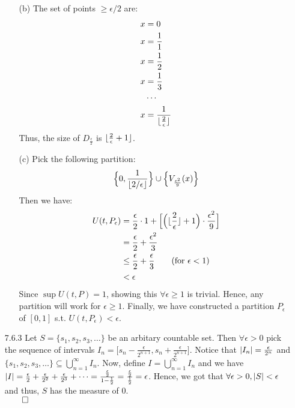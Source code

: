 \documentclass[11pt]{article}
\DeclarePairedDelimiter\abs{\lvert}{\rvert}%
\DeclarePairedDelimiter\floor{\lfloor}{\rfloor}
\begin{document}
\begin{itemize}
\begin{itemize}
            \item[(b)]
                The set of points $\geq \epsilon/2$ are:
                \begin{align*}
                    x &= 0\\
                    x &= \frac{1}{1}\\
                    x &= \frac{1}{2}\\
                    x &= \frac{1}{3}\\
                    &\cdots\\
                    x &= \frac{1}{\floor{\frac{2}{\epsilon}}}
                \end{align*}
                Thus, the size of $D_{\frac{\epsilon}{2}}$ is
                $\floor{\frac{2}{\epsilon} + 1}$.

            \item[(c)]
                Pick the following partition:
                \begin{equation*}
                    \Big\{0, \frac{1}{\floor{2/\epsilon}}\Big\} \cup
                        \Big\{V_{\frac{\epsilon^2}{9}}(x)\Big\}
                \end{equation*}
                Then we have:
                \begin{align*}
                  U(t, P_\epsilon) &= \frac{\epsilon}{2} \cdot 1 +
                        \Big[{\Big({\floor{\frac{2}{\epsilon}} + 1}\Big)
                        \cdot \frac{\epsilon^2}{9}}\Big]\\
                    &= \frac{\epsilon}{2} + \frac{\epsilon^2}{3}\\
                    &\leq \frac{\epsilon}{2} + \frac{\epsilon}{3}
                        \tag{for $\epsilon < 1$}\\
                    &< \epsilon
                \end{align*}
                Since $\sup U(t, P) = 1$, showing this $\forall \epsilon \geq
                1$ is trivial. Hence, any partition will work for $\epsilon
                \geq 1$. Finally, we have constructed a partition $P_\epsilon$
                of $[0, 1]$ s.t. $U(t, P_\epsilon) < \epsilon$.
        \end{itemize}

    \item[7.6.3]
        Let $S = \{s_1, s_2, s_3, \dots\}$ be an arbitary countable set. Then
        $\forall \epsilon > 0$ pick the sequence of intervals $I_n = \Big[s_n -
        \frac{\epsilon}{2^{n + 1}}, s_n + \frac{\epsilon}{2^{n + 1}}\Big]$.
        Notice that $\abs{I_n} = \frac{\epsilon}{2^n}$ and $\{s_1, s_2, s_3,
        \dots \} \subseteq \bigcup_{n = 1}^\infty I_n$. Now, define $I =
        \bigcup_{n = 1}^\infty I_n$ and we have $\abs{I} = \frac{\epsilon}{2} +
        \frac{\epsilon}{2^2} + \frac{\epsilon}{2^3} + \dots =
        \frac{\frac{\epsilon}{2}}{1 - \frac{1}{2}} =
        \frac{\frac{\epsilon}{2}}{\frac{1}{2}} = \epsilon$. Hence, we got that
        $\forall \epsilon > 0, \abs{S} < \epsilon$ and thus, $S$ has the
        measure of $0$.\\
        $\qed$
\end{itemize}

\end{document}
